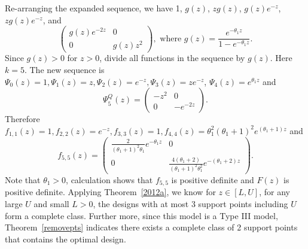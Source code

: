 \documentclass[12pt]{amsart}
\theoremstyle{definition}
\theoremstyle{remark}
\numberwithin{equation}{section}
\begin{document}
Re-arranging the expanded sequence, we have 1, $g(z)$, $zg(z)$, $g(z)e^{-z}$, $zg(z)e^{-z}$, and \[\left( \begin{array}{cc}
 g(z)e^{-2z} & 0\\
0 &g(z)z^2 
\end{array} \right), \text{ where }g(z) = \frac{e^{-\theta_1z}}{1-e^{-\theta_1z}}. \] Since $g(z)>0$ for $z>0$, divide all functions in the sequence by $g(z)$. Here $k=5$. The new sequence is $\Psi_0(z) =1, \Psi_1(z) = z, \Psi_2(z) = e^{-z}, \Psi_3(z) =ze^{-z}$, $\Psi_4(z) =e^{\theta_1z}$ and  \[\Psi_5^Q(z)= \left( \begin{array}{cc}
-z^2& 0\\
0 &-e^{-2z}
\end{array} \right).\]  Therefore $f_{1,1}(z) = 1,f_{2,2}(z) = e^{-z},f_{3,3}(z) = 1,f_{4,4}(z) = \theta_1^2(\theta_1+1)^2e^{(\theta_1+1)z}$ and  \[f_{5,5}(z)= \left( \begin{array}{cc}
\frac{2}{(\theta_1+1)^2\theta_1}e^{-\theta_1z}& 0\\
0 & \frac{4(\theta_1+2)}{(\theta_1+1)^2\theta_1^2}e^{-(\theta_1+2)z}
\end{array} \right).\] Note that $\theta_1>0$, calculation shows that $f_{5,5}$ is positive definite and $F(z)$ is positive definite. Applying Theorem~\ref{2012a}, we know for $z\in[L,U]$, for any large $U$ and small $L>0$, the designs with at most 3 support points including $U$ form a complete class. Further more, since this model is a Type III model, Theorem~\ref{removepts} indicates there exists a complete class of 2 support points that contains the optimal design. 

\end{document}
